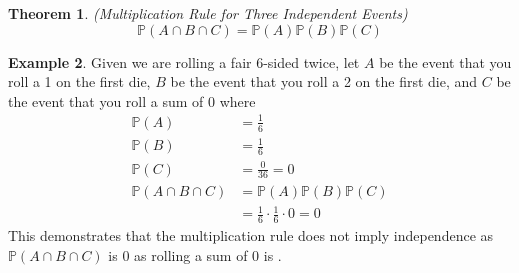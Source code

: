 \documentclass[12pt]{article}
\newcommand{\bbP}{\mathbb{P}}
\renewcommand{\_}[1]{\underline{ #1 }}
\newtheorem{theorem}{Theorem}[section]
\theoremstyle{definition}
\newtheorem{example}[theorem]{Example}
\numberwithin{equation}{subsection}
\begin{document}
    \begin{theorem}
      (Multiplication Rule for Three Independent Events)
      \[\bbP(A\cap B\cap C)=\bbP(A)\bbP(B)\bbP(C)\]
    \end{theorem}

  \begin{example}
    Given we are rolling a fair 6-sided twice, let $A$ be the event that you roll a 1 on the first die, $B$ be the event that you roll a 2 on the first die, and $C$ be the event that you roll a sum of 0 where
    \begin{align*}
      \bbP(A)&=\frac{1}{6} \\
      \bbP(B)&=\frac{1}{6} \\
      \bbP(C)&=\frac{0}{36}=0 \\
      \bbP(A\cap B\cap C)&=\bbP(A)\bbP(B)\bbP(C) \\
        &=\frac{1}{6}\cdot \frac{1}{6}\cdot 0 = 0
    \end{align*}
    This demonstrates that the multiplication rule does not imply independence as $\bbP(A\cap B\cap C)$ is 0 as rolling a sum of 0 is . \\
  \end{example}
\end{document}
